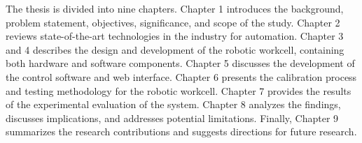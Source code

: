 The thesis is divided into nine chapters. Chapter 1 introduces the 
background, problem statement, objectives, significance, and scope 
of the study. Chapter 2 reviews state-of-the-art technologies in the
industry for automation. Chapter 3 and 4 describes the design and development
of the robotic workcell, containing both hardware and software components.
Chapter 5 discusses the 
development of the control software and web interface. Chapter 6 
presents the calibration process and testing methodology for the 
robotic workcell. Chapter 7 provides the results of the experimental 
evaluation of the system. Chapter 8 analyzes the findings, discusses 
implications, and addresses potential limitations. Finally, Chapter 9
summarizes the research contributions and suggests directions for
future research.